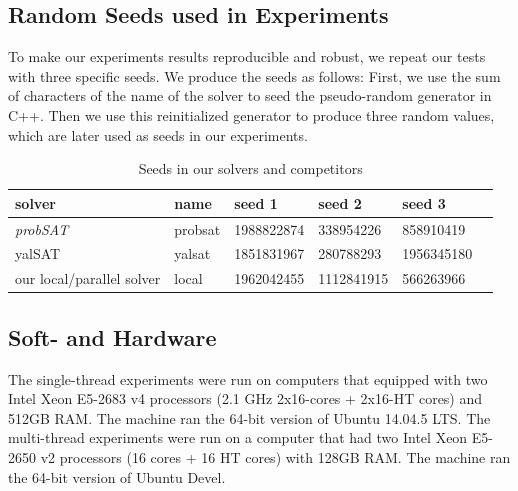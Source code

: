 \documentclass[12pt,a4paper,twoside]{scrartcl}
\numberwithin{equation}{section}
\begin{document}
\subsection{Random Seeds used in Experiments}
\label{sec:seed}
To make our experiments results reproducible and robust, we repeat our tests with three specific seeds. We produce the seeds as follows: First, we use the sum of characters of the name of the solver to seed the pseudo-random generator in C++.  Then we use this reinitialized generator to produce three random values, which are later used as seeds in our experiments. 
\begin{table}[h!]
\begin{center}
    \begin{tabular}{|l|l|l|l|l|p{1cm}|}
\hline 
    solver&name&seed 1&seed 2&seed 3 \\ \hline
	\emph{probSAT}&probsat&1988822874&338954226 &858910419 \\ \hline
	yalSAT &yalsat&1851831967&280788293&1956345180 \\ \hline
	our local/parallel solver & local&1962042455&1112841915&566263966 \\ \hline
	
\end{tabular}
\caption[probSAT]{Seeds in our solvers and competitors}
\end{center}
\end{table} 
\subsection{Soft- and Hardware}
The single-thread experiments were run on computers that equipped with two Intel Xeon E5-2683 v4 processors  (2.1 GHz 2x16-cores + 2x16-HT cores) and 512GB RAM. The machine ran the 64-bit version
of  Ubuntu 14.04.5 LTS. The multi-thread experiments were run on a computer that had two Intel Xeon E5-2650 v2 processors (16 cores + 16 HT cores) with 128GB RAM. The machine ran the 64-bit version of Ubuntu Devel. 
\clearpage
\end{document}
